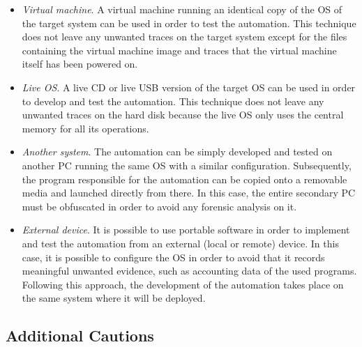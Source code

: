 \documentclass[runningheads]{llncs}
\begin{document}
\begin{itemize}
 \item \emph{Virtual machine}. A virtual machine running an identical copy of the OS of the target system can be used in order to test the automation. This technique does not leave any unwanted traces on the target system except for the files containing the virtual machine image and traces that the virtual machine itself has been powered on.
 \item \emph{Live OS}. A live CD or live USB version of the target OS can be used in order to develop and test the automation. This technique does not leave any unwanted traces on the hard disk because the live OS only uses the central memory for all its operations.
 \item \emph{Another system}. The automation can be simply developed and tested on another PC running the same OS with a similar configuration. Subsequently, the program responsible for the automation can be copied onto a removable media and launched directly from there. In this case, the entire secondary PC must be obfuscated in order to avoid any forensic analysis on it.
 \item \emph{External device}. It is possible to use portable software in order to implement and test the automation from an external (local or remote) device. In this case, it is possible to configure the OS in order to avoid that it records meaningful unwanted evidence, such as accounting data of the used programs. Following this approach, the development of the automation takes place on the same system where it will be deployed.
\end{itemize}

\subsection{Additional Cautions}
\end{document}
